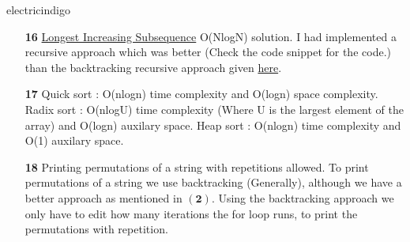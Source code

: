 \documentclass[12pt]{article}
\begin{document}
\begin{mybox}{electricindigo}{}
	\begin{itemize}
		\item[\textbf{16}] \href{https://www.geeksforgeeks.org/longest-monotonically-increasing-subsequence-size-n-log-n/}{Longest Increasing Subsequence} O(NlogN) solution. I had implemented a recursive approach which was better (Check the code snippet for the code.) than the backtracking recursive approach given \href{https://www.geeksforgeeks.org/longest-increasing-subsequence-dp-3/}{here}.
		\item[\textbf{17}] Quick sort : O(nlogn) time complexity and O(logn) space complexity. Radix sort : O(nlogU) time complexity (Where U is the largest element of the array) and O(logn) auxilary space. Heap sort : O(nlogn) time complexity and O(1) auxilary space.
		\item[\textbf{18}] Printing permutations of a string with repetitions allowed. To print permutations of a string we use backtracking (Generally), although we have a better approach as mentioned in $(\textbf{2})$. Using the backtracking approach we only have to edit how many iterations the for loop runs, to print the permutations with repetition.
	\end{itemize}
	
\end{mybox}

	

		
		
\end{document}
